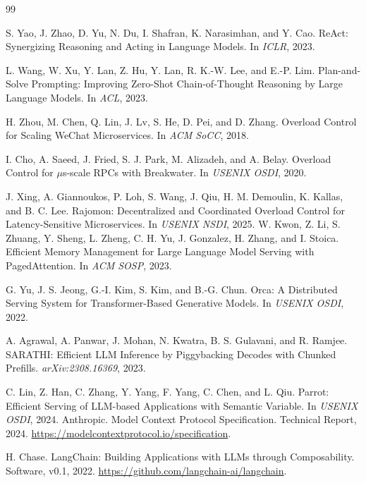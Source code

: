 \documentclass[sigconf,review,anonymous]{acmart}
\begin{document}
\begin{thebibliography}{99}

S. Yao, J. Zhao, D. Yu, N. Du, I. Shafran, K. Narasimhan, and Y. Cao.
\newblock ReAct: Synergizing Reasoning and Acting in Language Models.
\newblock In \emph{ICLR}, 2023.

L. Wang, W. Xu, Y. Lan, Z. Hu, Y. Lan, R. K.-W. Lee, and E.-P. Lim.
\newblock Plan-and-Solve Prompting: Improving Zero-Shot Chain-of-Thought Reasoning by Large Language Models.
\newblock In \emph{ACL}, 2023.

H. Zhou, M. Chen, Q. Lin, J. Lv, S. He, D. Pei, and D. Zhang.
\newblock Overload Control for Scaling WeChat Microservices.
\newblock In \emph{ACM SoCC}, 2018.

I. Cho, A. Saeed, J. Fried, S. J. Park, M. Alizadeh, and A. Belay.
\newblock Overload Control for $\mu$s-scale RPCs with Breakwater.
\newblock In \emph{USENIX OSDI}, 2020.

J. Xing, A. Giannoukos, P. Loh, S. Wang, J. Qiu, H. M. Demoulin, K. Kallas, and B. C. Lee.
\newblock Rajomon: Decentralized and Coordinated Overload Control for Latency-Sensitive Microservices.
\newblock In \emph{USENIX NSDI}, 2025.
W. Kwon, Z. Li, S. Zhuang, Y. Sheng, L. Zheng, C. H. Yu, J. Gonzalez, H. Zhang, and I. Stoica.
\newblock Efficient Memory Management for Large Language Model Serving with PagedAttention.
\newblock In \emph{ACM SOSP}, 2023.

G. Yu, J. S. Jeong, G.-I. Kim, S. Kim, and B.-G. Chun.
\newblock Orca: A Distributed Serving System for Transformer-Based Generative Models.
\newblock In \emph{USENIX OSDI}, 2022.

A. Agrawal, A. Panwar, J. Mohan, N. Kwatra, B. S. Gulavani, and R. Ramjee.
\newblock SARATHI: Efficient LLM Inference by Piggybacking Decodes with Chunked Prefills.
\newblock \emph{arXiv:2308.16369}, 2023.

C. Lin, Z. Han, C. Zhang, Y. Yang, F. Yang, C. Chen, and L. Qiu.
\newblock Parrot: Efficient Serving of LLM-based Applications with Semantic Variable.
\newblock In \emph{USENIX OSDI}, 2024.
Anthropic.
\newblock Model Context Protocol Specification.
\newblock Technical Report, 2024.
\newblock \url{https://modelcontextprotocol.io/specification}.

H. Chase.
\newblock LangChain: Building Applications with LLMs through Composability.
\newblock Software, v0.1, 2022.
\newblock \url{https://github.com/langchain-ai/langchain}.


\end{thebibliography}
\end{document}
